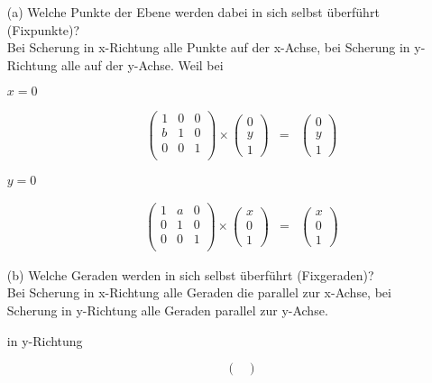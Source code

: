 \documentclass[11pt]{article}
\begin{document}
\begin{enumerate}
\item[(a)] Welche Punkte der Ebene werden dabei in sich selbst überführt (Fixpunkte)?\\
Bei Scherung in x-Richtung alle Punkte auf der x-Achse, bei Scherung in y-Richtung alle auf der y-Achse.
Weil bei 
\begin{description}
\item[$x=0$]
\begin{eqnarray*}
\begin{pmatrix}
1 & 0 & 0 \\
b & 1 & 0 \\
0 & 0 & 1 \\ 
\end{pmatrix}
\times
\begin{pmatrix}
0 \\ y \\ 1
\end{pmatrix}
&=& 
\begin{pmatrix}
0 \\ y \\ 1
\end{pmatrix}
\end{eqnarray*}
\item[$y=0$]
\begin{eqnarray*}
\begin{pmatrix}
1 & a & 0 \\
0 & 1 & 0 \\
0 & 0 & 1 \\ 
\end{pmatrix}
\times
\begin{pmatrix}
x \\ 0 \\ 1
\end{pmatrix}
&=& 
\begin{pmatrix}
x \\ 0 \\ 1
\end{pmatrix}
\end{eqnarray*}
\end{description}
\item[(b)] Welche Geraden werden in sich selbst überführt (Fixgeraden)?\\
Bei Scherung in x-Richtung alle Geraden die parallel zur x-Achse, bei Scherung in y-Richtung alle Geraden parallel zur y-Achse.
\begin{description}
\item[in y-Richtung]
$$
\begin{pmatrix}

\end{pmatrix}$$
\end{description}
\end{enumerate}
\end{document}
